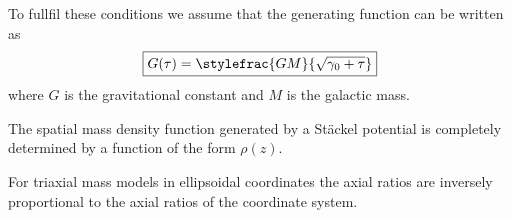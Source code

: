     To fullfil these conditions we assume that the generating function can be written as
    \begin{equation}
    	\boxed{G(\tau) = \stylefrac{GM}{\sqrt{\gamma_0 + \tau}}}
    \end{equation}
    where $G$ is the gravitational constant and $M$ is the galactic mass.
    
    \begin{theorem}
    	The spatial mass density function generated by a St\"ackel potential is completely determined by a function of the form $\rho(z)$.
    \end{theorem}
    \begin{result}
    	For triaxial mass models in ellipsoidal coordinates the axial ratios are inversely proportional to the axial ratios of the coordinate system.
    \end{result}

